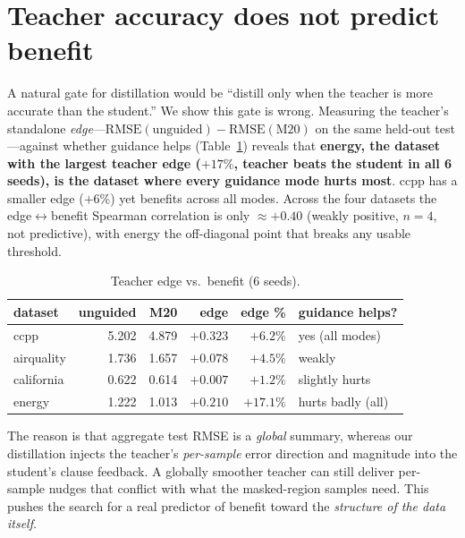 \section{Teacher accuracy does not predict benefit}
\label{sec:teacher_edge}

A natural gate for distillation would be ``distill only when the teacher is more accurate
than the student.'' We show this gate is wrong. Measuring the teacher's standalone
\emph{edge}---$\mathrm{RMSE}(\text{unguided}) - \mathrm{RMSE}(\text{M20})$ on the same
held-out test---against whether guidance helps (Table~\ref{tab:edge}) reveals that
\textbf{energy, the dataset with the largest teacher edge ($+17\%$, teacher beats the
student in all 6 seeds), is the dataset where every guidance mode hurts most}. ccpp has a
smaller edge ($+6\%$) yet benefits across all modes. Across the four datasets the
edge$\leftrightarrow$benefit Spearman correlation is only $\approx +0.40$ (weakly
positive, $n=4$, not predictive), with energy the off-diagonal point that breaks any
usable threshold.

\begin{table}[t]
\centering
\caption{Teacher edge vs.\ benefit (6 seeds).}
\label{tab:edge}
\begin{tabular}{lrrrrl}
\toprule
dataset & unguided & M20 & edge & edge \% & guidance helps? \\
\midrule
ccpp       & 5.202 & 4.879 & $+0.323$ & $+6.2\%$  & yes (all modes) \\
airquality & 1.736 & 1.657 & $+0.078$ & $+4.5\%$  & weakly \\
california & 0.622 & 0.614 & $+0.007$ & $+1.2\%$  & slightly hurts \\
energy     & 1.222 & 1.013 & $\mathbf{+0.210}$ & $\mathbf{+17.1\%}$ & hurts badly (all) \\
\bottomrule
\end{tabular}
\end{table}

The reason is that aggregate test RMSE is a \emph{global} summary, whereas our
distillation injects the teacher's \emph{per-sample} error direction and magnitude into
the student's clause feedback. A globally smoother teacher can still deliver per-sample
nudges that conflict with what the masked-region samples need. This pushes the search for
a real predictor of benefit toward the \emph{structure of the data itself}.
